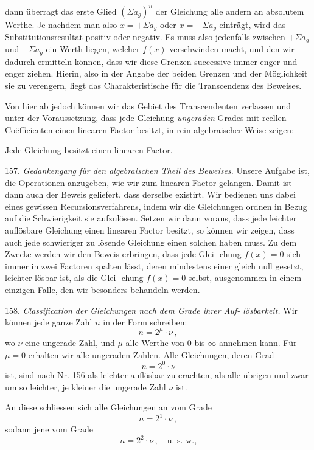 \documentclass[11pt]{article}
\providecommand{\weberpage}[1]{}
\let\Sigma\varSigma
\begin{document}
\weberpage{167}
dann überragt das erste Glied $(\Sigma a_g)^n$ der Gleichung alle andern an
absolutem Werthe. Je nachdem man also $x=+\Sigma a_g$ oder $x=-\Sigma a_g$
einträgt, wird das Substitutionsresultat positiv oder negativ. Es muss
also jedenfalls zwischen $+\Sigma a_g$ und $-\Sigma a_g$ ein Werth liegen, welcher
$f(x)$ verschwinden macht, und den wir dadurch ermitteln können, dass
wir diese Grenzen successive immer enger und enger ziehen. Hierin,
also in der Angabe der beiden Grenzen und der Möglichkeit sie zu
verengern, liegt das Charakteristische für die Transcendenz des Beweises.

Von hier ab jedoch können wir das Gebiet des Transcendenten
verlassen und unter der Voraussetzung, dass jede Gleichung \emph{ungeraden}
Grades mit reellen Co\"efficienten einen linearen Factor besitzt, in rein
algebraischer Weise zeigen:

\glqq Jede Gleichung besitzt einen linearen Factor.\grqq{}

157. \emph{Gedankengang für den algebraischen Theil des Beweises.} Unsere
Aufgabe ist, die Operationen anzugeben, wie wir zum linearen Factor
gelangen. Damit ist dann auch der Beweis geliefert, dass derselbe
existirt. Wir bedienen uns dabei eines gewissen Recursionsverfahrens,
indem wir die Gleichungen ordnen in Bezug auf die Schwierigkeit sie
aufzulösen. Setzen wir dann voraus, dass jede leichter auflösbare
Gleichung einen linearen Factor besitzt, so können wir zeigen, dass
auch jede schwieriger zu lösende Gleichung einen solchen haben muss.
Zu dem Zwecke werden wir den Beweis erbringen, dass jede Glei-
chung $f(x)=0$ sich immer in zwei Factoren spalten lässt, deren
mindestens einer gleich null gesetzt, leichter lösbar ist, als die Glei-
chung $f(x)=0$ selbst, ausgenommen in einem einzigen Falle, den
wir besonders behandeln werden.

158. \emph{Classification der Gleichungen nach dem Grade ihrer Auf-
lösbarkeit.} Wir können jede ganze Zahl $n$ in der Form schreiben:
\[ n = 2^{\mu}\cdot \nu\, , \]
wo $\nu$ eine ungerade Zahl, und $\mu$ alle Werthe von 0 bis $\infty$ annehmen
kann. Für $\mu=0$ erhalten wir alle ungeraden Zahlen. Alle Gleichungen,
deren Grad
\[ n = 2^{0}\cdot \nu \]
ist, sind nach Nr. 156 als leichter auflösbar zu erachten, als alle
übrigen und zwar um so leichter, je kleiner die ungerade Zahl $\nu$ ist.

An diese schliessen sich alle Gleichungen an vom Grade
\[ n = 2^{1}\cdot \nu\, , \]
sodann jene vom Grade
\[ n = 2^{2}\cdot \nu\, , \quad \text{u. s. w.,} \]
\end{document}
